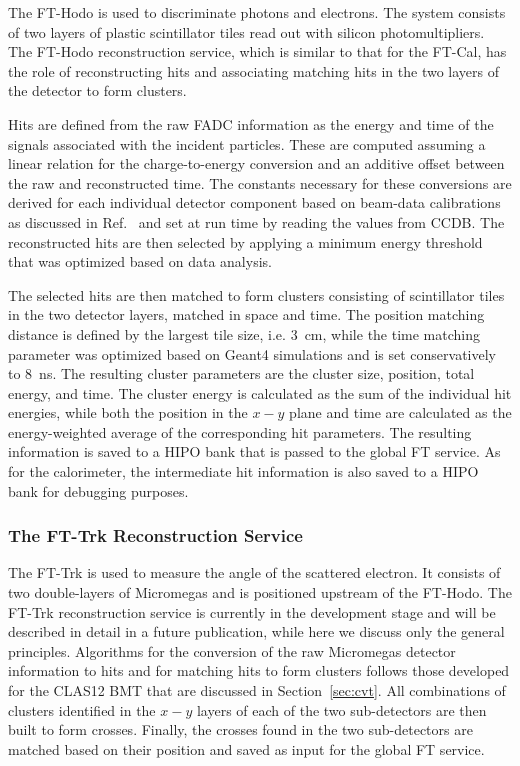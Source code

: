 The FT-Hodo is used to discriminate photons and electrons. The system consists of two layers of plastic scintillator
tiles read out with silicon photomultipliers. The FT-Hodo reconstruction service, which is similar to that for the
FT-Cal, has the role of reconstructing hits and associating matching hits in the two layers of the detector to form
clusters. 

Hits are defined from the raw FADC information as the energy and time of the signals associated with the incident
particles. These are computed assuming a linear relation for the charge-to-energy conversion and an additive
offset between the raw and reconstructed time. The constants necessary for these conversions are derived
for each individual detector component based on beam-data calibrations as discussed in Ref.~\cite{ft-nim} and set
at run time by reading the values from CCDB. The reconstructed hits are then selected by applying a minimum energy
threshold that was optimized based on data analysis.

The selected hits are then matched to form clusters consisting of scintillator tiles in the two detector layers,
matched in space and time. The position matching distance is defined by the largest tile size, i.e. 3~cm, while the
time matching parameter was optimized based on Geant4 simulations and is set conservatively to 8~ns. The
resulting cluster parameters are the cluster size, position, total energy, and time. The cluster energy is calculated
as the sum of the individual hit energies, while both the position in the $x-y$ plane and time are calculated as the
energy-weighted average of the corresponding hit parameters. The resulting information is saved to a HIPO bank
that is passed to the global FT service. As for the calorimeter, the intermediate hit information is also saved to a
HIPO bank for debugging purposes.

\subsubsection{The FT-Trk Reconstruction Service}

The FT-Trk is used to measure the angle of the scattered electron. It consists of two double-layers of
Micromegas and is positioned upstream of the FT-Hodo. The FT-Trk reconstruction service is currently in the
development stage and will be described in detail in a future publication, while here we discuss only the general
principles. Algorithms for the conversion of the raw Micromegas detector information to hits and for matching
hits to form clusters follows those developed for the CLAS12 BMT that are discussed in Section~\ref{sec:cvt}.
All combinations of clusters identified in the $x-y$ layers of each of the two sub-detectors are then built to form
crosses. Finally, the  crosses found in the two sub-detectors are matched based on their position and saved as input
for the global FT service.

